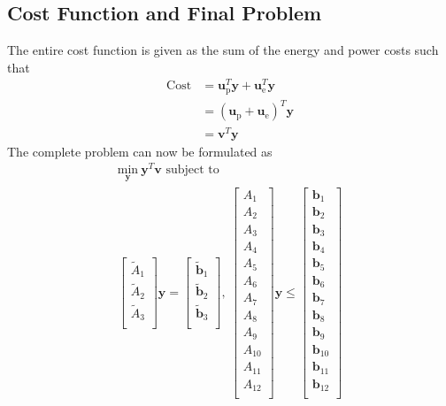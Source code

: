\subsection{Cost Function and Final Problem}
The entire cost function is given as the sum of the energy and power costs such that
\begin{equation}\begin{aligned}
	\text{Cost} &= \mathbf{u}_{\text{p}}^T\mathbf{y} + \mathbf{u}_{\text{e}}^T\mathbf{y} \\
	            &= \left( \mathbf{u}_{\text{p}} + \mathbf{u}_{\text{e}} \right )^T\mathbf{y} \\
		    &= \mathbf{v}^T\mathbf{y}
\end{aligned}\end{equation}
The complete problem can now be formulated as
\begin{equation}\begin{matrix}
	\underset{\mathbf{y}}{\text{min}} \ \mathbf{y}^T\mathbf{v} \text{ subject to } \\
	\begin{bmatrix}
		\tilde{A}_{1} \\ 
		\tilde{A}_{2} \\
		\tilde{A}_{3} \\
	\end{bmatrix}\mathbf{y} = 
	\begin{bmatrix}
		\tilde{\mathbf{b}}_{1} \\
		\tilde{\mathbf{b}}_{2} \\
		\tilde{\mathbf{b}}_{3} \\
	\end{bmatrix}, \ 
	\begin{bmatrix}
		A_{1} \\
		A_{2} \\
		A_{3} \\
		A_{4} \\
		A_{5} \\
		A_{6} \\
		A_{7} \\
		A_{8} \\
		A_{9} \\
		A_{10}\\
		A_{11}\\
		A_{12}\\
	 \end{bmatrix}\mathbf{y} \le 
	 \begin{bmatrix}
		\mathbf{b}_{1} \\
		\mathbf{b}_{2} \\
		\mathbf{b}_{3} \\
		\mathbf{b}_{4} \\
		\mathbf{b}_{5} \\
		\mathbf{b}_{6} \\
		\mathbf{b}_{7} \\
		\mathbf{b}_{8} \\
		\mathbf{b}_{9} \\
		\mathbf{b}_{10}\\
		\mathbf{b}_{11}\\
		\mathbf{b}_{12}\\
	 \end{bmatrix}
\end{matrix} \end{equation}
